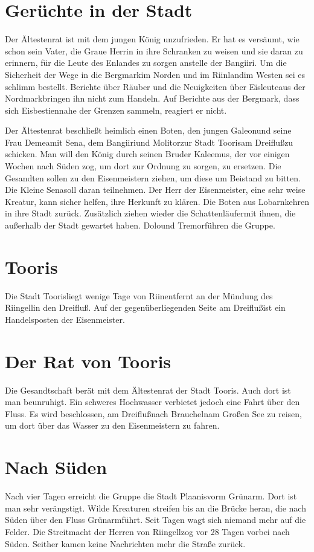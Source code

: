 \documentclass[12pt,a4paper,onecolumn,twoside,ngerman]{book}
\newcommand{\Molitor}{Molitor}
\newcommand{\Sena}{Sena}
\newcommand{\Bangiri}{Bangiiri}
\newcommand{\Enland}{Enland}
\newcommand{\Schattenlaufer}{Schattenläufer}
\newcommand{\Dolo}{Dolo}
\newcommand{\Tremor}{Tremor}
\newcommand{\Lobarn}{Lobarn}
\newcommand{\Nordmark}{Nordmark}
\newcommand{\Bergmark}{Bergmark}
\newcommand{\Eisleute}{Eisleute}
\newcommand{\Eisbestien}{Eisbestien}
\newcommand{\Rhinland}{Riinland}
\newcommand{\Rhingell}{Riingell}
\newcommand{\Rhin}{Riin}
\newcommand{\Kalemus}{Kaleemus}
\newcommand{\Galeon}{Galeon}
\newcommand{\Demea}{Demea}
\newcommand{\Dreifluss}{Dreifluß}
\newcommand{\Toris}{Tooris}
\newcommand{\Planis}{Plaanis}
\newcommand{\Grunarm}{Grünarm}
\newcommand{\Braucheln}{Braucheln}
\newcommand{\Eisenmeister}{Eisenmeister}
\begin{document}
\section{Gerüchte in der Stadt}
Der Ältestenrat ist mit dem jungen König unzufrieden. Er hat es versäumt, wie schon sein Vater, die Graue Herrin in ihre Schranken zu weisen und sie daran zu erinnern, für die Leute des \Enland{es} zu sorgen anstelle der \Bangiri . Um die Sicherheit der Wege in die \Bergmark  im Norden und im \Rhinland  im Westen sei es schlimm bestellt. Berichte über Räuber und die Neuigkeiten über \Eisleute  aus der \Nordmark bringen ihn nicht zum Handeln. Auf Berichte aus der \Bergmark , dass sich \Eisbestien   nahe der Grenzen sammeln, reagiert er nicht.

Der Ältestenrat beschließt heimlich einen Boten, den jungen \Galeon  und seine Frau \Demea mit \Sena , dem \Bangiri  und \Molitor  zur Stadt \Toris  am \Dreifluss  zu schicken. Man will den König durch seinen Bruder \Kalemus , der vor einigen Wochen nach Süden zog, um dort zur Ordnung zu sorgen, zu ersetzen. Die Gesandten sollen zu den \Eisenmeister{n} ziehen, um diese um Beistand zu bitten. Die Kleine \Sena  soll daran teilnehmen. Der Herr der \Eisenmeister, eine sehr weise Kreatur, kann sicher helfen, ihre Herkunft zu klären. Die Boten aus \Lobarn  kehren in ihre Stadt zurück. Zusätzlich ziehen wieder die \Schattenlaufer mit ihnen, die außerhalb der Stadt gewartet haben. \Dolo  und \Tremor  führen die Gruppe.

\section{\Toris}
Die Stadt \Toris  liegt wenige Tage von \Rhin  entfernt an der Mündung des \Rhingell  in den \Dreifluss . Auf der gegenüberliegenden Seite am \Dreifluss  ist ein Handelsposten der \Eisenmeister .

\section{Der Rat von \Toris}
Die Gesandtschaft berät mit dem Ältestenrat der Stadt \Toris . Auch dort ist man beunruhigt. Ein schweres Hochwasser verbietet jedoch eine Fahrt über den Fluss. Es wird beschlossen, am \Dreifluss  nach \Braucheln  am Großen See zu reisen, um dort über das Wasser zu den \Eisenmeister n zu fahren.

\section{Nach Süden}
Nach vier Tagen erreicht die Gruppe die Stadt \Planis  vorm \Grunarm . Dort ist man sehr verängstigt. Wilde Kreaturen streifen bis an die Brücke heran, die nach Süden über den Fluss \Grunarm  führt. Seit Tagen wagt sich niemand mehr auf die Felder. Die Streitmacht der Herren von \Rhingell  zog vor 28 Tagen vorbei nach Süden. Seither kamen keine Nachrichten mehr die Straße zurück.
 
\end{document}
